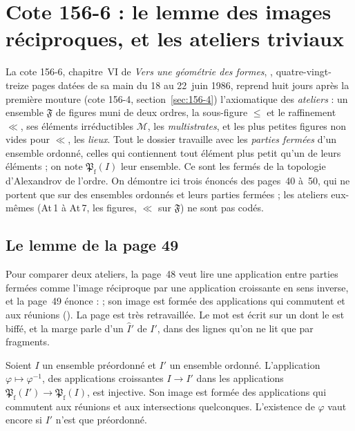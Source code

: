 \section[Cote 156-6 : le lemme des images réciproques, et les ateliers triviaux]{Cote 156-6 : le lemme des images réciproques, et les ateliers triviaux\protect{}}\label{sec:156-6}

La cote 156-6, chapitre~VI de \emph{Vers une géométrie des formes}, , quatre-vingt-treize pages datées de sa main du 18 au 22~juin 1986, reprend huit jours après la première mouture (cote 156-4, section~\ref{sec:156-4}) l'axiomatique des \emph{ateliers} : un ensemble $\mathfrak F$ de figures muni de deux ordres, la sous-figure $\leq$ et le raffinement $\ll$, ses éléments irréductibles $\mathcal M$, les \emph{multistrates}, et les plus petites figures non vides pour $\ll$, les \emph{lieux}. Tout le dossier travaille avec les \emph{parties fermées} d'un ensemble ordonné, celles qui contiennent tout élément plus petit qu'un de leurs éléments ; on note $\mathfrak P_{\mathrm f}(I)$ leur ensemble. Ce sont les fermés de la topologie d'Alexandrov de l'ordre. On démontre ici trois énoncés des pages~40 à~50, qui ne portent que sur des ensembles ordonnés et leurs parties fermées ; les ateliers eux-mêmes (At\,1 à At\,7, les figures, $\ll$ sur $\mathfrak F$) ne sont pas codés.

\subsection*{Le lemme de la page 49}

Pour comparer deux ateliers, la page~48 veut lire une application entre parties fermées comme l'image réciproque par une application croissante en sens inverse, et la page~49 énonce :  ; son image est formée des applications qui commutent  et aux réunions (). La page est très retravaillée. Le mot  est écrit sur un  dont le  est biffé, et la marge parle d'un  $\widehat I'$ de $I'$, dans des lignes qu'on ne lit que par fragments.

\begin{enonce}
Soient $I$ un ensemble préordonné et $I'$ un ensemble ordonné. L'application $\varphi \mapsto \varphi^{-1}$, des applications croissantes $I \to I'$ dans les applications $\mathfrak P_{\mathrm f}(I') \to \mathfrak P_{\mathrm f}(I)$, est injective. Son image est formée des applications qui commutent aux réunions et aux intersections quelconques. L'existence de $\varphi$ vaut encore si $I'$ n'est que préordonné.
\end{enonce}

